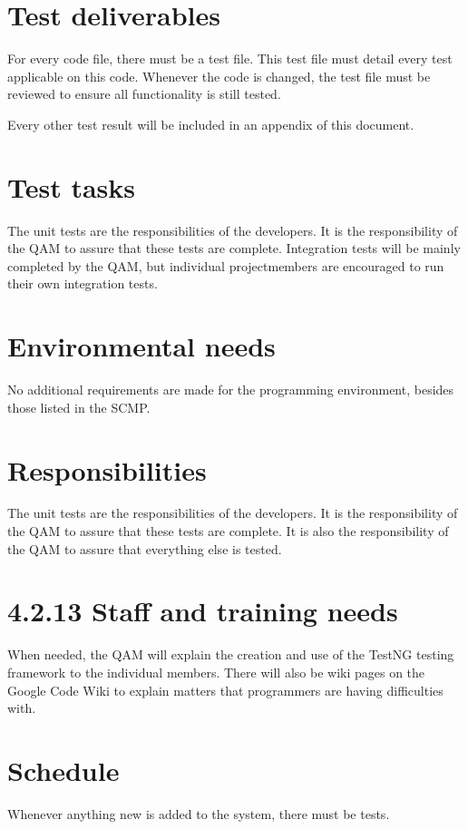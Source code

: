\documentclass[salesmen, twoside]{../../../templates/latex/2009/softproj}
\begin{document}
\begin{projdoc}
\section{Test deliverables}
For every code file, there must be a test file. This test file must detail every test applicable on this code. Whenever the code is changed, the test file must be reviewed to ensure all functionality is still tested.

Every other test result will be included in an appendix of this document.

\section{Test tasks}
The unit tests are the responsibilities of the developers. It is the responsibility of the QAM to assure that these tests are complete. Integration tests will be mainly completed by the QAM, but individual projectmembers are encouraged to run their own integration tests.

\section{Environmental needs}
No additional requirements are made for the programming environment, besides those listed in the SCMP\cite{SCMP}.

\section{Responsibilities}
The unit tests are the responsibilities of the developers. It is the responsibility of the QAM to assure that these tests are complete. It is also the responsibility of the QAM to assure that everything else is tested.

\section{4.2.13 Staff and training needs}
When needed, the QAM will explain the creation and use of the TestNG testing framework to the individual members. There will also be wiki pages on the Google Code Wiki\cite{googleSVN} to explain matters that programmers are having difficulties with.

\section{Schedule}
Whenever anything new is added to the system, there must be tests.


\end{projdoc}
\end{document}

